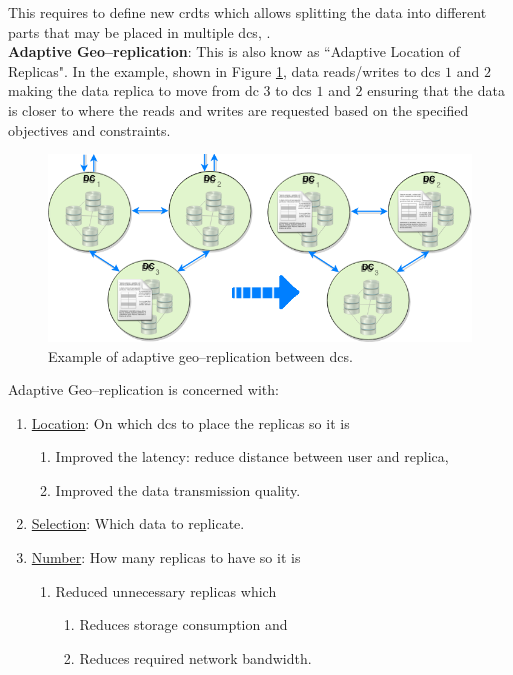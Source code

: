 \documentclass[12pt,twoside]{article}
\begin{document}
This requires to define new \glspl{crdt} which allows splitting the data into different parts that may be placed in multiple \glspl{dc}, \cite{Briquemont2015a}.\\


{\bf Adaptive Geo--replication}: 
This is  also know as ``Adaptive Location of Replicas". In the example, shown in Figure \ref{fig:adaptive_location_replicas}, data reads/writes to \glspl{dc} $1$ and $2$ making the data replica to move from \gls{dc} $3$ to \glspl{dc} $1$ and $2$ ensuring that the data is closer to where the reads and writes are requested based on the specified objectives and constraints.
\begin{figure}[ht!]
	\centering
	\includegraphics[width=1\textwidth]{figures/adaptiveReplication.png}
		
	\caption{Example of adaptive geo--replication between \glspl{dc}.}
	\label{fig:adaptive_location_replicas}
\end{figure}

Adaptive Geo--replication is concerned with:
\begin{enumerate}
	\item \underline{Location}: On which \glspl{dc} to place the replicas so it is
	\begin{enumerate}
		\item Improved the latency: reduce distance between user and replica,

		\item Improved the data transmission quality.
	\end{enumerate}

	\item \underline{Selection}: Which data to replicate.

	\item \underline{Number}: How many replicas to have so it is 
	\begin{enumerate}
		\item Reduced unnecessary replicas which 
		\begin{enumerate}
			\item Reduces storage consumption and

			\item Reduces required network bandwidth.
		\end{enumerate}
	\end{enumerate}
\end{enumerate}
\end{document}
